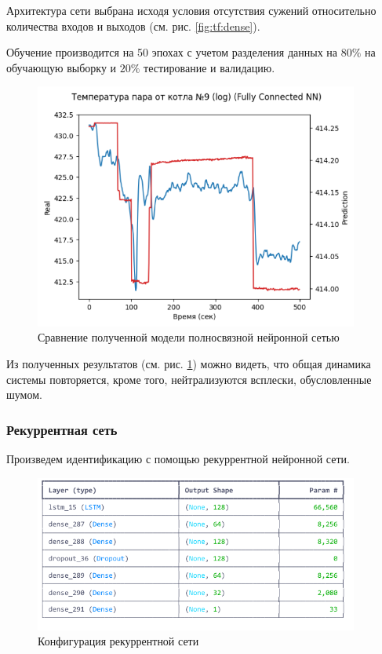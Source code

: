 Архитектура сети выбрана исходя условия отсутствия сужений относительно
количества входов и выходов (см. рис. \ref{fig:tf:dense}). 

Обучение производится на 50 эпохах с учетом разделения данных на $80\%$ на
обучающую выборку и $20\%$ тестирование и валидацию. 

\begin{figure}[H]
  \begin{center}
    \includegraphics[width=0.95\textwidth]{figures/tensorflow/dense_compare.png}
  \end{center}
  \caption{Сравнение полученной модели полносвязной нейронной
  сетью}\label{fig:tf:cmp:dense}
\end{figure}

Из полученных результатов (см. рис. \ref{fig:tf:cmp:dense}) можно видеть, что
общая динамика системы повторяется, кроме того, нейтрализуются всплески,
обусловленные шумом. 

\subsubsection{Рекуррентная сеть}

Произведем идентификацию с помощью рекуррентной нейронной сети. 

\begin{figure}[H]
  \begin{center}
    \includegraphics[width=0.95\textwidth]{figures/tensorflow/rnn.png}
  \end{center}
  \caption{Конфигурация рекуррентной сети}\label{fig:tf:rnn}
\end{figure}

